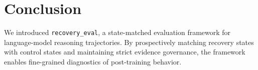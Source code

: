 \documentclass[10pt,conference]{IEEEtran}
\begin{document}
\section{Conclusion}
We introduced \texttt{recovery\_eval}, a state-matched evaluation framework for language-model reasoning trajectories. By prospectively matching recovery states with control states and maintaining strict evidence governance, the framework enables fine-grained diagnostics of post-training behavior.



\end{document}
